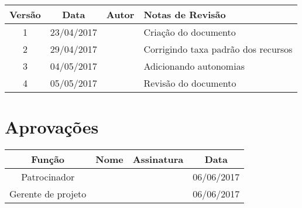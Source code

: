\begin{table}[H]
	\begin{tabularx}{\textwidth}{| c | c | X | X |}
		\hline
		\textbf{Versão} & \textbf{Data} & \textbf{Autor}        & \textbf{Notas de Revisão}           \\
		\hline
		1                & 23/04/2017    & \projectManagerName{} & Criação do documento               \\
		\hline
		2                & 29/04/2017    & \projectManagerName{} & Corrigindo taxa padrão dos recursos \\
		\hline
		3                & 04/05/2017    & \projectManagerName{} & Adicionando autonomias               \\
		\hline
		4                & 05/05/2017    & \projectManagerName{} & Revisão do documento                \\
		\hline
	\end{tabularx}
	\centering
\end{table}

\section{Aprovações}

\begin{table}[H]
	\begin{tabularx}{\textwidth}{| c | c | X | c |}
		\hline
		\textbf{Função}  & \textbf{Nome}         & \textbf{Assinatura}        & \textbf{Data} \\
		\hline
		Patrocinador       & \projectSponsorName{} & \projectSponsorSignature{} & 06/06/2017    \\
		\hline
		Gerente de projeto & \projectManagerName{} & \projectManagerSignature{} & 06/06/2017    \\
		\hline
	\end{tabularx}
	\centering
\end{table}

